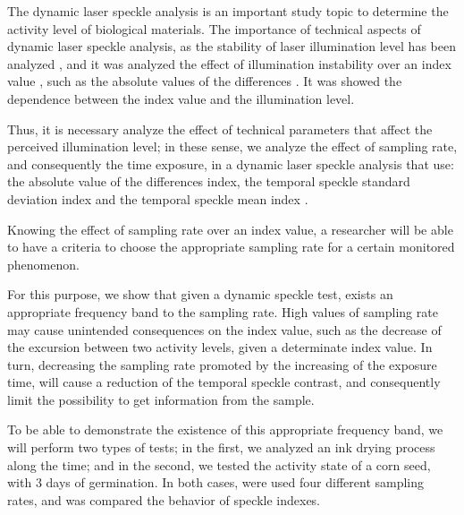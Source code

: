 \documentclass[review]{elsarticle}
\begin{document}
The dynamic laser speckle analysis is  an important
study topic\cite{catalano2019viability,rivera2019sound,gonzalez2018diode,Silva2018,braga2017dynamic} 
to determine the  activity level of biological materials. 
The importance of technical aspects of dynamic laser speckle analysis,
as the stability of laser illumination level has been  analyzed \cite{gonzalez2018diode}, 
and it was analyzed the effect of illumination instability over an index value \cite{gonzalez2018diode},
such as the absolute values of the differences \cite{cardoso2014,rivera2017selection}.
It  was showed the dependence between the index value and the illumination level. 

Thus, 
it is necessary analyze the effect of technical parameters that affect the perceived illumination level; 
in these sense,
we analyze the effect of sampling rate, 
and consequently the time exposure, in a dynamic laser speckle analysis
that use: the absolute value of the differences index, 
the temporal speckle standard deviation index and the temporal speckle mean index \cite{Nothdurft:05}. 

Knowing the effect of sampling rate over an index value,
a researcher will be able to have a criteria to choose the appropriate sampling rate
for a certain monitored phenomenon. 

For this purpose, we show that given a dynamic speckle test, exists an appropriate frequency band
to the sampling rate. High values of sampling rate may cause unintended consequences on the index value, 
such as the decrease of the excursion between two activity levels, given a determinate index value. 
In turn, decreasing the sampling rate promoted by the increasing of the exposure time,
will cause a reduction of the temporal speckle contrast,
 and consequently limit the possibility  to get information from the sample.  

To be able to demonstrate the existence of this appropriate frequency band,
we will perform two types of tests; in the first, we analyzed an ink drying process along the time; and in
the second, we tested the activity state of a corn seed, with 3 days of germination.
In both cases, were used four different sampling rates, 
and was compared the behavior of speckle indexes.
\end{document}
